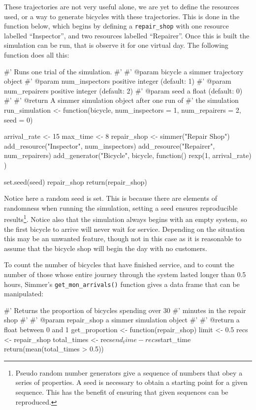 These trajectories are not very useful alone, we are yet to define the resources
used, or a way to generate bicycles with these trajectories. This is done in the
function below, which begins by defining a \texttt{repair_shop} with one
resource labelled ``Inspector'', and two resources labelled ``Repairer''.
Once this is built the simulation can be run, that is observe it for one
virtual day. The following function does all this:

\begin{Rin}
#' Runs one trial of the simulation.
#'
#' @param bicycle a simmer trajectory object
#' @param num_inspectors positive integer (default: 1)
#' @param num_repairers positive integer (default: 2)
#' @param seed a float (default: 0)
#'
#' @return A simmer simulation object after one run of
#'         the simulation
run_simulation <- function(bicycle,
                           num_inspectors = 1,
                           num_repairers = 2,
                           seed = 0) {
  arrival_rate <- 15
  max_time <- 8
  repair_shop <-
    simmer("Repair Shop") %
    add_resource("Inspector", num_inspectors) %
    add_resource("Repairer", num_repairers) %
    add_generator("Bicycle", bicycle, function() {
      rexp(1, arrival_rate)
    })

  set.seed(seed)
  repair_shop %
  return(repair_shop)
}
\end{Rin}

Notice here a random seed is set. This is because there are elements of
randomness when running the simulation, setting a seed ensures reproducible
results\footnote{
Pseudo random number generators give a sequence of numbers that obey a series of
properties. A seed is necessary to obtain a starting point for a given sequence.
This has the benefit of ensuring that given sequences can be reproduced.
}.
Notice also that the simulation always begins with an empty system, so the first
bicycle to arrive will never wait for service. Depending on the situation this
may be an unwanted feature, though not in this case as it is reasonable to
assume that the bicycle shop will begin the day with no customers.

To count the number of bicycles that have finished service, and to
count the number of those whose entire journey through the system lasted longer
than 0.5 hours, Simmer's \texttt{get_mon_arrivals()} function gives a
data frame that can be manipulated:

\begin{Rin}
#' Returns the proportion of bicycles spending over 30
#' minutes in the repair shop
#'
#' @param repair_shop a simmer simulation object
#'
#' @return a float between 0 and 1
get_proportion <- function(repair_shop) {
  limit <- 0.5
  recs <- repair_shop %
  total_times <- recs$end_time - recs$start_time
  return(mean(total_times > 0.5))
}
\end{Rin}

